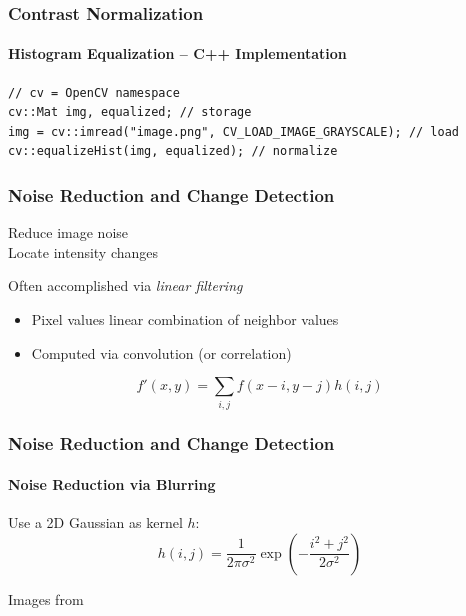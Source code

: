 \documentclass[xetex,professionalfont]{beamer}
\begin{document}

\begin{frame}[fragile]
\frametitle{Contrast Normalization}
\framesubtitle{Histogram Equalization -- C++ Implementation}

\begin{verbatim}
// cv = OpenCV namespace
cv::Mat img, equalized; // storage
img = cv::imread("image.png", CV_LOAD_IMAGE_GRAYSCALE); // load
cv::equalizeHist(img, equalized); // normalize
\end{verbatim}

\end{frame}


\begin{frame}
\frametitle{Noise Reduction and Change Detection}

Reduce image noise\\\medskip
Locate intensity changes

\bigskip
Often accomplished via \emph{linear filtering}
\begin{itemize}
	\item Pixel values linear combination of neighbor values
	\item Computed via convolution (or correlation)
\end{itemize}

\[
f'(x,y) = \sum_{i,j}f(x-i,y-j)h(i,j) %
\]

\end{frame}


\begin{frame}
\frametitle{Noise Reduction and Change Detection}
\framesubtitle{Noise Reduction via Blurring}

Use a 2D Gaussian as kernel $h$:
\[
h(i,j)=\frac{1}{2\pi\sigma^2}\exp\left(-\frac{i^2+j^2}{2\sigma^2}\right)
\]

\begin{center}
	{\centering Images from \cite{prince12}}
\end{center}

\end{frame}
\end{document}
